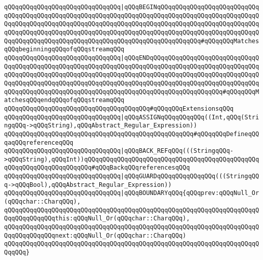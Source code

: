 \verb|qQQqqQQqqQQqqQQqqQQqqQQqqQQqqQQq|\verb#|qQQqBEGINqQQqqQQqqQQqqQQqqQQqqQQqqQQqqQQqqQQqqQQqqQQqqQQqqQQqqQQqqQQqqQQqqQQqqQQqqQQqqQQqqQQqqQQqqQQqqQQqqQQqqQQqqQQqqQQqqQQqqQQqqQQqqQQqqQQqqQQqqQQqqQQqqQQqqQQqqQQqqQQqqQQqqQQqqQQqqQQqqQQqqQQqqQQqqQQqqQQqqQQqqQQqqQQqqQQqqQQqqQQqqQQqqQQqqQQqqQQqqQQqqQQqqQQqqQQqqQQqqQQqqQQqqQQqqQQqqQQqqQQqqQQqqQQqqQQq#\verb|#qQQqqQQqMatchesqQQqbeginningqQQqofqQQqstreamqQQq|\newline
\verb|qQQqqQQqqQQqqQQqqQQqqQQqqQQqqQQq|\verb#|qQQqENDqQQqqQQqqQQqqQQqqQQqqQQqqQQqqQQqqQQqqQQqqQQqqQQqqQQqqQQqqQQqqQQqqQQqqQQqqQQqqQQqqQQqqQQqqQQqqQQqqQQqqQQqqQQqqQQqqQQqqQQqqQQqqQQqqQQqqQQqqQQqqQQqqQQqqQQqqQQqqQQqqQQqqQQqqQQqqQQqqQQqqQQqqQQqqQQqqQQqqQQqqQQqqQQqqQQqqQQqqQQqqQQqqQQqqQQqqQQqqQQqqQQqqQQqqQQqqQQqqQQqqQQqqQQqqQQqqQQqqQQqqQQqqQQqqQQqqQQqqQQq#\verb|#qQQqqQQqMatchesqQQqendqQQqofqQQqstreamqQQq|\newline
\newline
\verb|qQQqqQQqqQQqqQQqqQQqqQQqqQQqqQQqqQQqqQQq#qQQqqQQqExtensionsqQQq|\newline
\newline
\verb|qQQqqQQqqQQqqQQqqQQqqQQqqQQqqQQq|\verb#|qQQqASSIGNqQQqqQQqqQQq((Int,qQQq(StringqQQq->qQQqString),qQQqAbstract_Regular_Expression))#\newline
\newline
\verb|qQQqqQQqqQQqqQQqqQQqqQQqqQQqqQQqqQQqqQQqqQQqqQQqqQQq#qQQqqQQqDefineqQQqaqQQqreferenceqQQq|\newline
\newline
\verb|qQQqqQQqqQQqqQQqqQQqqQQqqQQqqQQq|\verb#|qQQqBACK_REFqQQq(((StringqQQq->qQQqString),qQQqInt))qQQqqQQqqQQqqQQqqQQqqQQqqQQqqQQqqQQqqQQqqQQqqQQqqQQqqQQqqQQqqQQqqQQqqQQq#\verb|#qQQqBackqQQqreferencesqQQq|\newline
\newline
\verb|qQQqqQQqqQQqqQQqqQQqqQQqqQQqqQQq|\verb#|qQQqGUARDqQQqqQQqqQQqqQQq(((StringqQQq->qQQqBool),qQQqAbstract_Regular_Expression))#\newline
\newline
\verb|qQQqqQQqqQQqqQQqqQQqqQQqqQQqqQQq|\verb#|qQQqBOUNDARYqQQq{qQQqprev:qQQqNull_Or(qQQqchar::CharqQQq),#\newline
\verb|qQQqqQQqqQQqqQQqqQQqqQQqqQQqqQQqqQQqqQQqqQQqqQQqqQQqqQQqqQQqqQQqqQQqqQQqqQQqqQQqqQQqthis:qQQqNull_Or(qQQqchar::CharqQQq),|\newline
\verb|qQQqqQQqqQQqqQQqqQQqqQQqqQQqqQQqqQQqqQQqqQQqqQQqqQQqqQQqqQQqqQQqqQQqqQQqqQQqqQQqqQQqnext:qQQqNull_Or(qQQqchar::CharqQQq)|\newline
\verb|qQQqqQQqqQQqqQQqqQQqqQQqqQQqqQQqqQQqqQQqqQQqqQQqqQQqqQQqqQQqqQQqqQQqqQQqqQQq}|\newline
